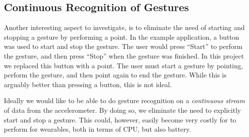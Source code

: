 \subsection{Continuous Recognition of Gestures}

Another interesting aspect to investigate, 
is to eliminate the need of starting and stopping a gesture by performing a point. 
In the \threedollar example application, 
a button was used to start and stop the gesture. 
The user would press ``Start'' to perform the gesture, 
and then press ``Stop'' when the gesture was finished. 
In this project we replaced this button with a point. 
The user must start a gesture by pointing, 
perform the gesture, 
and then point again to end the gesture. 
While this is arguably better than pressing a button, 
this is not ideal.

Ideally we would like to be able to do gesture recognition on a \emph{continuous stream} of data from the accelerometer. 
By doing so, we eliminate the need to explicitly start and stop a gesture.
This could, however, easily become very costly for to perform for wearables,
both in terms of CPU, but also battery.

